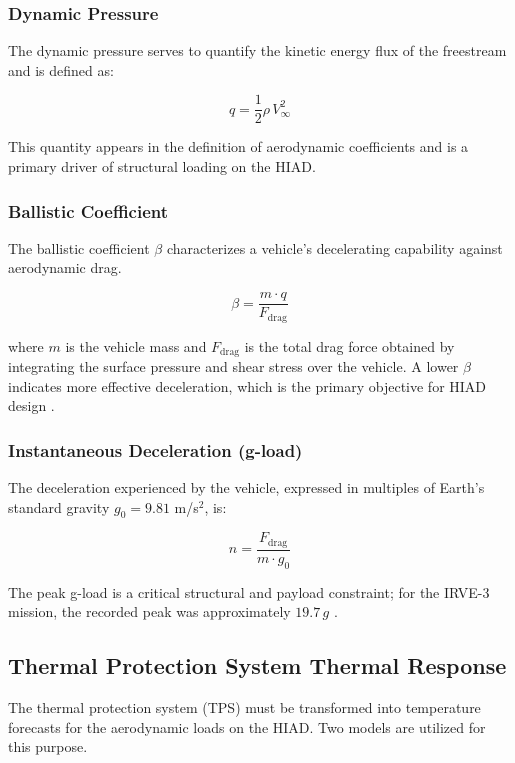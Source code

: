 \subsubsection*{Dynamic Pressure}
The dynamic pressure serves to quantify the kinetic energy flux of the freestream and is defined as:

\begin{equation}
    q = \frac{1}{2} \rho \, V_{\infty}^{2}
    \label{eq:dynamic_pressure}
\end{equation}

\noindent This quantity appears in the definition of aerodynamic coefficients and is a primary driver of structural loading on the HIAD.

\subsubsection*{Ballistic Coefficient}
The ballistic coefficient $\beta$ characterizes a vehicle's decelerating capability against aerodynamic drag.

\begin{equation}
    \beta = \frac{m \cdot q}{F_{\text{drag}}}
    \label{eq:ballistic_coefficient}
\end{equation}

\noindent where $m$ is the vehicle mass and $F_{\text{drag}}$ is the total drag force obtained by integrating the surface pressure and shear stress over the vehicle. A lower $\beta$ indicates more effective deceleration, which is the primary objective for HIAD design \cite{AndersonHypersonic}.

\subsubsection*{Instantaneous Deceleration (g-load)}
The deceleration experienced by the vehicle, expressed in multiples of Earth's standard gravity $g_0 = 9.81$ m/s$^{2}$, is:

\begin{equation}
    n = \frac{F_{\text{drag}}}{m \cdot g_0}
    \label{eq:gload}
\end{equation}

\noindent The peak g-load is a critical structural and payload constraint; for the IRVE-3 mission, the recorded peak was approximately $19.7\,g$ \cite{old2013irve3postflight}.

\subsection{Thermal Protection System Thermal Response}
The thermal protection system (TPS) must be transformed into temperature forecasts for the aerodynamic loads on the HIAD. Two models are utilized for this purpose.

